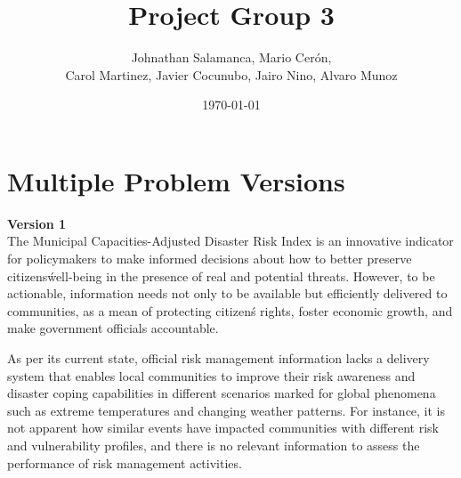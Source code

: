 \documentclass[11pt]{article}
\title{Project Group 3}
\author{ Johnathan Salamanca, Mario Cer\'{o}n, \\
Carol Martinez, Javier Cocunubo, Jairo Nino, Alvaro Munoz
 }
\date{\today}
\begin{document}
\maketitle







\section{Multiple Problem Versions}
\label{sec:app}

\textbf{Version 1}\\

The Municipal Capacities-Adjusted Disaster Risk Index is an innovative indicator for policymakers to make informed decisions about how to better preserve citizens\' well-being in the presence of real and potential threats. However, to be actionable, information needs not only to be available but efficiently delivered to communities, as a mean of protecting citizen\'s rights, foster economic growth, and make government officials accountable. 

As per its current state, official risk management information lacks a delivery system that enables local communities to improve their risk awareness and disaster coping capabilities in different scenarios marked for global phenomena such as extreme temperatures and changing weather patterns.
For instance, it is not apparent how similar events have impacted communities with different risk and vulnerability profiles, and there is no relevant information to assess the performance of risk management activities.  

\end{document}
